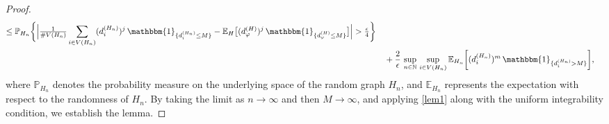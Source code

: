 \documentclass[10pt,a4paper]{amsart}
\newcommand{\E}{\mathbb E}
\newcommand{\N}{\mathbb N}
\renewcommand{\P}{\mathbb P}
\begin{document}
\begin{proof}
\begin{align*}
\leq \P_{H_{n}}\bigg\{\Big |\tfrac{1}{\#V(H_{n})}\sum_{i\in V(H_{n})}(d_{i}^{(H_{n})})^{j}\,\mathbbm{1}_{\{d_{i}^{(H_{n})}\leq M\}}-\E_{H}\big[(d_{\varphi}^{(H)})^{j}\,\mathbbm{1}_{\{d_{\varphi}^{(H)}\leq M\}}\big]\Big|>\tfrac{\epsilon}{4}\bigg\}\\&\quad
+\frac{2}{\epsilon}\,\sup_{n\in\N}\,\sup_{i\in V(H_{n})}\E_{H_{n}}\bigg[(d_{i}^{(H_{n})})^{m}\,\mathbbm{1}_{\{d_{i}^{(H_{n})}> M\}}\bigg],
\end{align*}
where $\P_{H_{n}}$ denotes the probability measure on the underlying space of the random graph $H_{n}$, and $\E_{H_{n}}$ represents the expectation with respect to the randomness of $H_{n}$. By taking the limit as $n\to\infty$ and then $M\to\infty$, and applying \eqref{lem1} along with the uniform integrability condition, we establish the lemma.
\end{proof}
\end{document}
